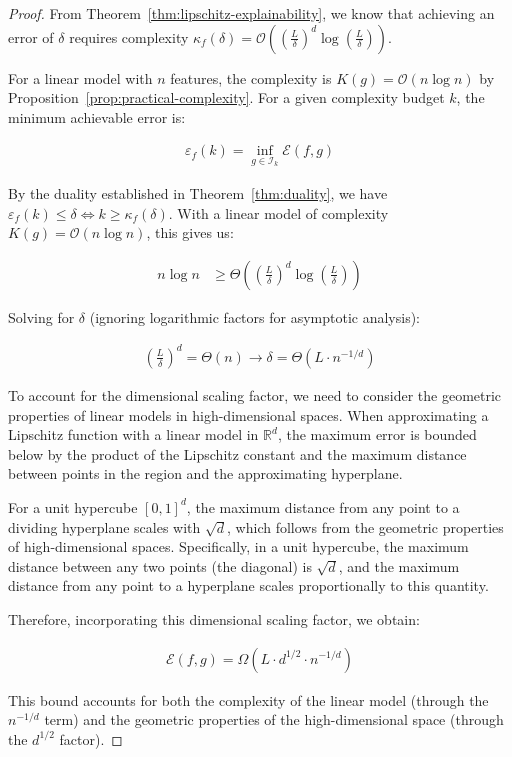 \documentclass[11pt,letter,leqno]{article}
\begin{document}
\begin{proof}
From Theorem~\ref{thm:lipschitz-explainability}, we know that achieving an error of $\delta$ requires complexity $\kappa_f(\delta) = \mathcal{O}\left(\left(\frac{L}{\delta}\right)^d \log\left(\frac{L}{\delta}\right)\right)$. 

For a linear model with $n$ features, the complexity is $K(g) = \mathcal{O}(n \log n)$ by Proposition~\ref{prop:practical-complexity}.  For a given complexity budget $k$, the minimum achievable error is:

\begin{align}
\varepsilon_f(k) = \inf_{g \in \mathcal{I}_k} \mathcal{E}(f, g)
\end{align}

By the duality established in Theorem~\ref{thm:duality}, we have $\varepsilon_f(k) \leq \delta \iff k \geq \kappa_f(\delta)$.  With a linear model of complexity $K(g) = \mathcal{O}(n \log n)$, this gives us:

\begin{align}
n \log n &\geq \Theta\left(\left(\frac{L}{\delta}\right)^d \log\left(\frac{L}{\delta}\right)\right)
\end{align}

Solving for $\delta$ (ignoring logarithmic factors for asymptotic analysis):

\begin{align}
\left(\frac{L}{\delta}\right)^d = \Theta(n) \rightarrow
\delta = \Theta\left(L \cdot n^{-1/d}\right)
\end{align}

To account for the dimensional scaling factor, we need to consider the geometric properties of linear models in high-dimensional spaces.  When approximating a Lipschitz function with a linear model in $\mathbb{R}^d$, the maximum error is bounded below by the product of the Lipschitz constant and the maximum distance between points in the region and the approximating hyperplane.

For a unit hypercube $[0,1]^d$, the maximum distance from any point to a dividing hyperplane scales with $\sqrt{d}$, which follows from the geometric properties of high-dimensional spaces.  Specifically, in a unit hypercube, the maximum distance between any two points (the diagonal) is $\sqrt{d}$, and the maximum distance from any point to a hyperplane scales proportionally to this quantity.

Therefore, incorporating this dimensional scaling factor, we obtain:

\begin{align}
\mathcal{E}(f, g) = \Omega\left(L \cdot d^{1/2} \cdot n^{-1/d}\right)
\end{align}

This bound accounts for both the complexity of the linear model (through the $n^{-1/d}$ term) and the geometric properties of the high-dimensional space (through the $d^{1/2}$ factor).
\end{proof}
\end{document}

